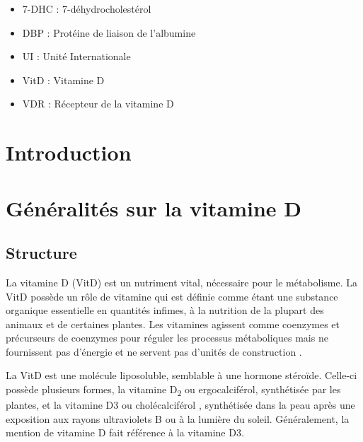 \documentclass[
  letterpaper,
  DIV=11,
  numbers=noendperiod]{scrartcl}
\providecommand{\tightlist}{%
  \setlength{\itemsep}{0pt}\setlength{\parskip}{0pt}}\usepackage{longtable,booktabs,array}
\begin{document}
\begin{itemize}
\tightlist
\item
  7-DHC : 7-déhydrocholestérol
\item
  DBP : Protéine de liaison de l'albumine
\item
  UI : Unité Internationale
\item
  VitD : Vitamine D
\item
  VDR : Récepteur de la vitamine D
\end{itemize}

\newpage{}

\hypertarget{introduction}{%
\section{Introduction}\label{introduction}}


\newpage{}

\hypertarget{guxe9nuxe9ralituxe9s-sur-la-vitamine-d}{%
\section{Généralités sur la vitamine
D}\label{guxe9nuxe9ralituxe9s-sur-la-vitamine-d}}

\hypertarget{structure}{%
\subsection{Structure}\label{structure}}

La vitamine D (VitD) est un nutriment vital, nécessaire pour le
métabolisme. La VitD possède un rôle de vitamine qui est définie comme
étant une substance organique essentielle en quantités infimes, à la
nutrition de la plupart des animaux et de certaines plantes. Les
vitamines agissent comme coenzymes et précurseurs de coenzymes pour
réguler les processus métaboliques mais ne fournissent pas d'énergie et
ne servent pas d'unités de construction \autocite{Ellison.2020}.

La VitD est une molécule liposoluble, semblable à une hormone stéroïde.
Celle-ci possède plusieurs formes, la vitamine D\textsubscript{2} ou
ergocalciférol, synthétisée par les plantes, et la vitamine D3 ou
cholécalciférol , synthétisée dans la peau après une exposition aux
rayons ultraviolets B ou à la lumière du soleil. Généralement, la
mention de vitamine D fait référence à la vitamine D3.
\end{document}
